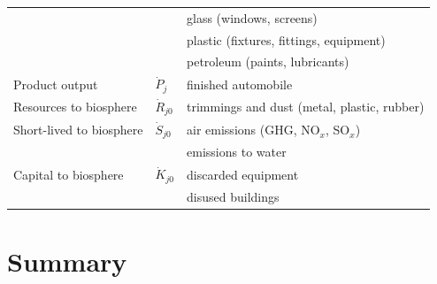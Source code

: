 \begin{table}
\begin{center}
\begin{tabular}{p{4cm}p{1cm}p{5.2cm}}
												&								&	 	glass (windows, screens)						\\
												&								&	 plastic (fixtures, fittings, equipment)		\\
												&								&	 	petroleum (paints, lubricants)				\\
\midrule
Product output							&	$\dot{P}_{j}$		&	finished automobile									\\
\midrule
Resources to biosphere			& $\dot{R}_{j0}$		&	trimmings and dust (metal, plastic, rubber)	\\[0.15cm]
Short-lived to biosphere			& $\dot{S}_{j0}$		&	air emissions (GHG, NO$_x$, SO$_x$)		\\
												&								& emissions to water									\\[0.15cm]
Capital to biosphere					& $\dot{K}_{j0}$	&	discarded equipment								\\
												&								& disused buildings										\\
\bottomrule
\end{tabular}
\end{center}
\label{tab:materials_auto}
\end{table}


\section{Summary}
\label{sec:materials_summary}







%
%

